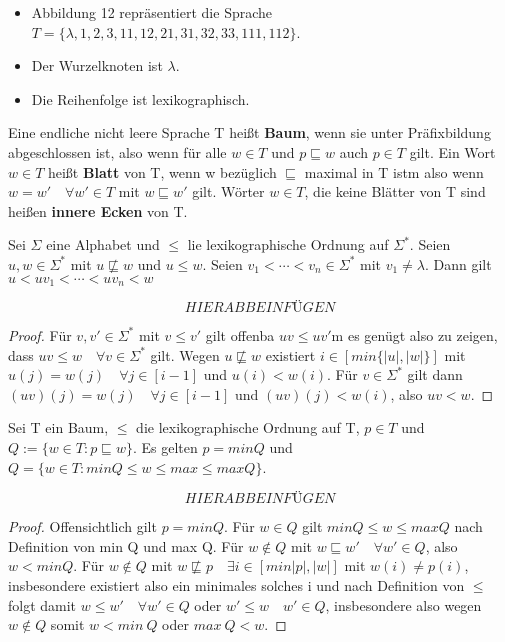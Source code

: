     \begin{itemize}
        \item Abbildung 12 repräsentiert die Sprache $T = \{\lambda, 1, 2, 3, 11, 12, 21, 31, 32, 33, 111, 112\}$.
        \item Der Wurzelknoten ist $\lambda$.
        \item Die Reihenfolge ist lexikographisch.
    \end{itemize}
    
    Eine endliche nicht leere Sprache T heißt \textbf{Baum}, wenn sie unter Präfixbildung abgeschlossen ist, also wenn für alle \(w \in T\) und \(p \sqsubseteq w\) auch \(p \in T\) gilt. Ein Wort \(w \in T\) heißt \textbf{Blatt} von T, wenn w bezüglich \(\sqsubseteq \) maximal in T istm also wenn \(w = w' \quad \forall w' \in T\) mit \(w \sqsubseteq w'\) gilt. Wörter \(w \in T\), die keine Blätter von T sind heißen \textbf{innere Ecken} von T.

    Sei \(\Sigma\) eine Alphabet und \(\leq\) lie lexikographische Ordnung auf \(\Sigma^*\). Seien \(u, w \in \Sigma^*\) mit \(u \not \sqsubseteq w\) und \(u \leq w\). Seien \(v_1<\cdots<v_n \in \Sigma^*\) mit \(v_1 \not = \lambda\). Dann gilt \(u < u v_1< \cdots < uv_n < w\)

    \[HIER ABB EINFÜGEN\]

    \begin{proof}
        Für \(v, v' \in \Sigma^*\) mit \(v \leq v'\) gilt offenba \(uv \leq uv'\)m es genügt also zu zeigen, dass \(uv \leq w \quad \forall v \in \Sigma^*\) gilt. Wegen \(u \not \sqsubseteq w\) existiert \(i \in [min \{|u|, |w|\}]\) mit \(u(j) = w(j) \quad \forall j \in [i-1]\) und \(u(i) < w(i)\). Für \(v \in \Sigma^*\) gilt dann \((uv)(j)=w(j) \quad \forall j \in [i - 1]\) und \((uv)(j)<w(i)\), also \(uv < w\).
    \end{proof}

    Sei T ein Baum, \(\leq\) die lexikographische Ordnung auf T, \(p \in T\) und \(Q:=\{w\in T: p\sqsubseteq w\}\). Es gelten \(p = min Q\) und \(Q = \{w \in T : min Q \leq w \leq max \leq max Q\}\). 

    \[HIER ABB EINFÜGEN\]

    \begin{proof}
        Offensichtlich gilt \(p = min Q\). Für \(w \in Q\) gilt \(min Q \leq w \leq max Q\) nach Definition von min Q und max Q. Für \(w \not \in Q\) mit \(w \sqsubseteq w' \quad \forall w' \in Q\), also \(w < min Q\). Für \(w \not \in Q\) mit \(w \not \sqsubseteq p \quad \exists i \in [min {|p|, |w|}]\) mit \(w(i) \not = p(i)\), insbesondere existiert also ein minimales solches i und nach Definition von \(\leq\) folgt damit \(w \leq w' \quad \forall w'\in Q\) oder \(w' \leq w \quad w' \in Q\), insbesondere also wegen \( w \not \in Q\) somit \( w < min \ Q\) oder \(max \ Q < w\).
    \end{proof}

